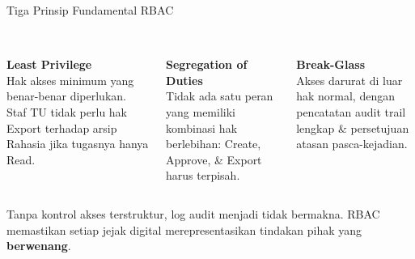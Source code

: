 \documentclass[aspectratio=169,11pt]{beamer}
\begin{document}
\begin{frame}{Tiga Prinsip Fundamental RBAC}
    \vspace{0.2cm}
    \begin{columns}[T]
        \centering
        [ICON] \\ \textbf{Least Privilege} \\
        \vspace{0.1cm}
        \scriptsize Hak akses minimum yang benar-benar diperlukan. Staf TU tidak perlu hak Export terhadap arsip Rahasia jika tugasnya hanya Read.
        
        \centering
        [ICON] \\ \textbf{Segregation of Duties} \\
        \vspace{0.1cm}
        \scriptsize Tidak ada satu peran yang memiliki kombinasi hak berlebihan: Create, Approve, \& Export harus terpisah.
        
        \centering
        [ICON] \\ \textbf{Break-Glass} \\
        \vspace{0.1cm}
        \scriptsize Akses darurat di luar hak normal, dengan pencatatan audit trail lengkap \& persetujuan atasan pasca-kejadian.
    \end{columns}
    
    \vspace{0.4cm}
    \begin{premiumbox}[Mengapa RBAC = Fondasi Keterlacakan?]
        \small
        Tanpa kontrol akses terstruktur, log audit menjadi tidak bermakna. RBAC memastikan setiap jejak digital merepresentasikan tindakan pihak yang \textbf{berwenang}.
    \end{premiumbox}
\end{frame}
\end{document}
